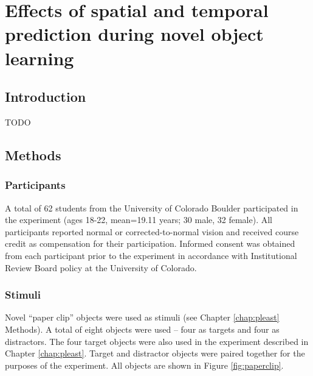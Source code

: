 \documentclass[dwyatte_dissertation.tex]{subfiles}
\begin{document}
\chapter{Effects of spatial and temporal prediction during novel object learning}

\section{Introduction}
TODO

\section{Methods}

\subsection{Participants}
A total of 62 students from the University of Colorado Boulder participated in the experiment (ages 18-22, mean=19.11 years; 30 male, 32 female). All participants reported normal or corrected-to-normal vision and received course credit as	compensation for their participation. Informed consent was obtained from each participant prior to the experiment in accordance with Institutional Review Board policy at the University of Colorado.

\subsection{Stimuli}
Novel ``paper clip'' objects were used as stimuli (see Chapter \ref{chap:pleast} Methods). A total of eight objects were used -- four as targets and four as distractors. The four target objects were also used in the experiment described in Chapter \ref{chap:pleast}. Target and distractor objects were paired together for the purposes of the experiment. All objects are shown in Figure \ref{fig:paperclip}.
\end{document}
